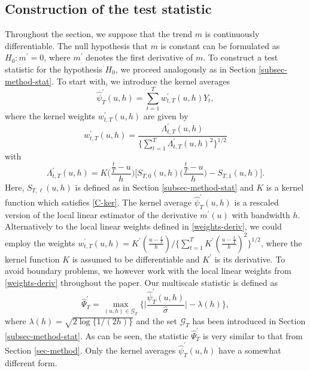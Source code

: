 \subsection{Construction of the test statistic}\label{subsec-test-shape-stat}


Throughout the section, we suppose that the trend $m$ is continuously differentiable. The null hypothesis that $m$ is constant can be formulated as $H_0: m^\prime = 0$, where $m^\prime$ denotes the first derivative of $m$. To construct a test statistic for the hypothesis $H_0$, we proceed analogously as in Section \ref{subsec-method-stat}. To start with, we introduce the kernel averages 
\begin{equation*}
\widehat{\psi}_T^\prime(u,h) = \sum\limits_{t=1}^T w_{t,T}^\prime(u,h) Y_t, 
\end{equation*}
where the kernel weights $w_{t,T}^\prime(u,h)$ are given by 
\begin{equation}\label{weights-deriv}
w_{t,T}^\prime(u,h) = \frac{\Lambda_{t,T}^\prime(u,h)}{ \{\sum\nolimits_{t=1}^T \Lambda_{t,T}^\prime(u,h)^2 \}^{1/2} } 
\end{equation}
with
\[ \Lambda_{t,T}^\prime(u,h) = K\Big(\frac{\frac{t}{T}-u}{h}\Big) \Big[ S_{T,0}(u,h) \Big(\frac{\frac{t}{T}-u}{h}\Big) - S_{T,1}(u,h) \Big]. \]
Here, $S_{T,\ell}(u,h)$ is defined as in Section \ref{subsec-method-stat} and $K$ is a kernel function which satisfies \ref{C-ker}. The kernel average $\widehat{\psi}_T^\prime(u,h)$ is a rescaled version of the local linear estimator of the derivative $m^\prime(u)$ with bandwidth $h$. Alternatively to the local linear weights defined in \eqref{weights-deriv}, we could employ the weights $w_{t,T}^\prime(u,h) = K^\prime( \frac{u - \frac{t}{T}}{h} )/ \{ \sum\nolimits_{t=1}^T  K^\prime( \frac{u - \frac{t}{T}}{h} )^2 \}^{1/2}$, where the kernel function $K$ is assumed to be differentiable and $K^\prime$ is its derivative. To avoid boundary problems, we however work with the local linear weights from \eqref{weights-deriv} throughout the paper. Our multiscale statistic is defined as 
\[ \widehat{\Psi}_T^\prime = \max_{(u,h) \in \mathcal{G}_T} \Big\{ \Big|\frac{\widehat{\psi}_T^\prime(u,h)}{\widehat{\sigma}}\Big| - \lambda(h) \Big\}, \] 
where $\lambda(h) = \sqrt{2 \log \{ 1/(2h) \}}$ and the set $\mathcal{G}_T$ has been introduced in Section \ref{subsec-method-stat}. As can be seen, the statistic $\widehat{\Psi}_T^\prime$ is very similar to that from Section \ref{sec-method}. Only the kernel averages $\widehat{\psi}_T^\prime(u,h)$ have a somewhat different form. 


